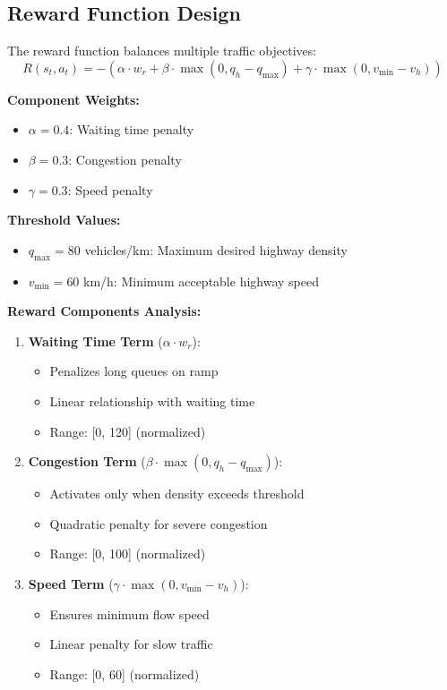 \documentclass[a4paper, 12pt]{article}
\begin{document}
\subsection{Reward Function Design}
\begin{tcolorbox}[title=Multi-objective Reward]
The reward function balances multiple traffic objectives:
\[
R(s_t, a_t) = -\left( \alpha \cdot w_r + \beta \cdot \max(0, q_h - q_{\text{max}}) + \gamma \cdot \max(0, v_{\text{min}} - v_h) \right)
\]

\textbf{Component Weights:}
\begin{itemize}
    \item \( \alpha = 0.4 \): Waiting time penalty
    \item \( \beta = 0.3 \): Congestion penalty
    \item \( \gamma = 0.3 \): Speed penalty
\end{itemize}

\textbf{Threshold Values:}
\begin{itemize}
    \item \( q_{\text{max}} = 80 \) vehicles/km: Maximum desired highway density
    \item \( v_{\text{min}} = 60 \) km/h: Minimum acceptable highway speed
\end{itemize}

\textbf{Reward Components Analysis:}
\begin{enumerate}
    \item \textbf{Waiting Time Term} (\( \alpha \cdot w_r \)):
    \begin{itemize}
        \item Penalizes long queues on ramp
        \item Linear relationship with waiting time
        \item Range: [0, 120] (normalized)
    \end{itemize}
    
    \item \textbf{Congestion Term} (\( \beta \cdot \max(0, q_h - q_{\text{max}}) \)):
    \begin{itemize}
        \item Activates only when density exceeds threshold
        \item Quadratic penalty for severe congestion
        \item Range: [0, 100] (normalized)
    \end{itemize}
    
    \item \textbf{Speed Term} (\( \gamma \cdot \max(0, v_{\text{min}} - v_h) \)):
    \begin{itemize}
        \item Ensures minimum flow speed
        \item Linear penalty for slow traffic
        \item Range: [0, 60] (normalized)
    \end{itemize}
\end{enumerate}
\end{tcolorbox}
\end{document}
